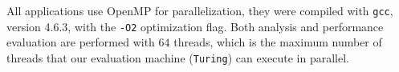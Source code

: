 %

%





All applications use OpenMP for parallelization, they were compiled with
\texttt{gcc}, version 4.6.3, with the \texttt{-O2} optimization flag.  Both
analysis and performance evaluation are performed with $64$ threads,
which is the maximum number of threads that our evaluation machine
(\texttt{Turing}) can execute in parallel.

